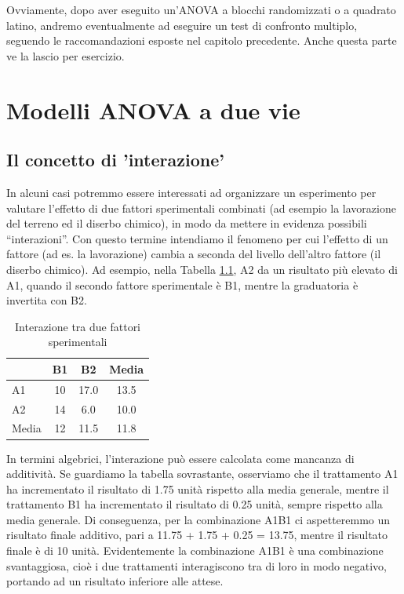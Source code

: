 \documentclass[a4paper,12pt,oneside]{book}
\begin{document}
Ovviamente, dopo aver eseguito un'ANOVA a blocchi randomizzati o a quadrato latino, andremo eventualmente ad eseguire un test di confronto multiplo, seguendo le raccomandazioni esposte nel capitolo precedente. Anche questa parte ve la lascio per esercizio.

\hypertarget{modelli-anova-a-due-vie}{%
\chapter{Modelli ANOVA a due vie}\label{modelli-anova-a-due-vie}}

\hypertarget{il-concetto-di-interazione}{%
\section{Il concetto di 'interazione'}\label{il-concetto-di-interazione}}

In alcuni casi potremmo essere interessati ad organizzare un esperimento per valutare l'effetto di due fattori sperimentali combinati (ad esempio la lavorazione del terreno ed il diserbo chimico), in modo da mettere in evidenza possibili ``interazioni''. Con questo termine intendiamo il fenomeno per cui l'effetto di un fattore (ad es. la lavorazione) cambia a seconda del livello dell'altro fattore (il diserbo chimico). Ad esempio, nella Tabella \ref{tab:tabName131}, A2 da un risultato più elevato di A1, quando il secondo fattore sperimentale è B1, mentre la graduatoria è invertita con B2.

\begin{table}[t]

\caption{\label{tab:tabName131}Interazione tra due fattori sperimentali}
\centering
\begin{tabular}{lccc}
\toprule
  & B1 & B2 & Media\\
\midrule
A1 & 10 & 17.0 & 13.5\\
A2 & 14 & 6.0 & 10.0\\
Media & 12 & 11.5 & 11.8\\
\bottomrule
\end{tabular}
\end{table}

In termini algebrici, l'interazione può essere calcolata come mancanza di additività. Se guardiamo la tabella sovrastante, osserviamo che il trattamento A1 ha incrementato il risultato di 1.75 unità rispetto alla media generale, mentre il trattamento B1 ha incrementato il risultato di 0.25 unità, sempre rispetto alla media generale. Di conseguenza, per la combinazione A1B1 ci aspetteremmo un risultato finale additivo, pari a 11.75 + 1.75 + 0.25 = 13.75, mentre il risultato finale è di 10 unità. Evidentemente la combinazione A1B1 è una combinazione svantaggiosa, cioè i due trattamenti interagiscono tra di loro in modo negativo, portando ad un risultato inferiore alle attese.
\end{document}
